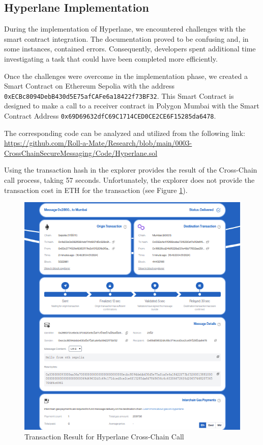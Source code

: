 \documentclass[fleqn,10pt]{olplainarticle}
\begin{document}
\newpage

\subsection{Hyperlane Implementation}

During the implementation of Hyperlane, we encountered challenges with the smart contract integration. The documentation proved to be confusing and, in some instances, contained errors. Consequently, developers spent additional time investigating a task that could have been completed more efficiently.

Once the challenges were overcome in the implementation phase, we created a Smart Contract on Ethereum Sepolia with the address \texttt{0xECBc8094DebB430d5E75afCAFe6a18422f73BF32}. This Smart Contract is designed to make a call to a receiver contract in Polygon Mumbai with the Smart Contract Address \texttt{0x69D69632dfC69C1714CED0CE2CE6F15285da6478}.

The corresponding code can be analyzed and utilized from the following link:
\url{https://github.com/Roll-a-Mate/Research/blob/main/0003-CrossChainSecureMessaging/Code/Hyperlane.sol}

Using the transaction hash in the explorer provides the result of the Cross-Chain call process, taking 57 seconds. Unfortunately, the explorer does not provide the transaction cost in ETH for the transaction (see Figure \ref{fig:hyperlaneethtomum}).

\begin{figure}[h]
	\centering
	\includegraphics[width=0.7\linewidth]{img/HyperlaneEthToMum}
	\caption{Transaction Result for Hyperlane Cross-Chain Call}
	\label{fig:hyperlaneethtomum}
\end{figure}
\end{document}
